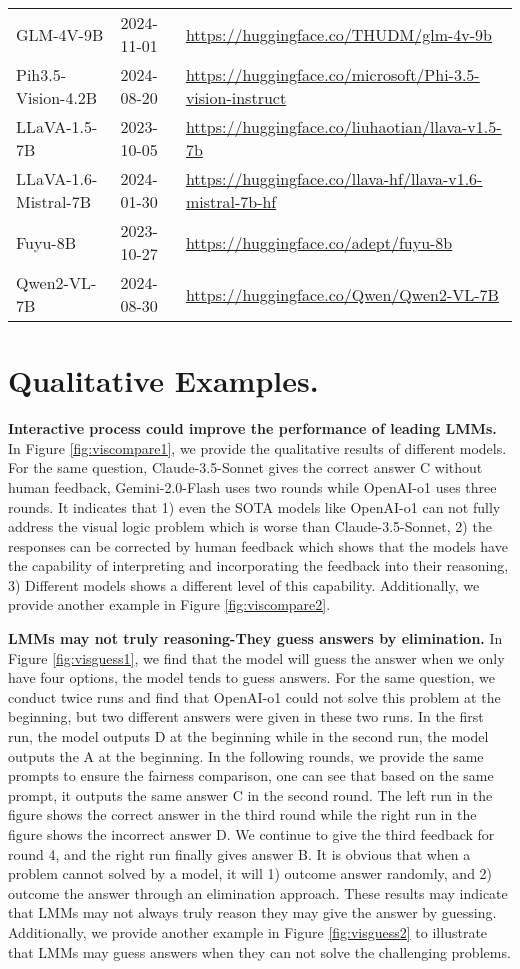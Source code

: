 \documentclass{article} %
\begin{document}
\begin{table}[ht]
{\begin{tabular}{l|l|l}
GLM-4V-9B & 2024-11-01 & \url{https://huggingface.co/THUDM/glm-4v-9b}\\
Pih3.5-Vision-4.2B & 2024-08-20 & \url{https://huggingface.co/microsoft/Phi-3.5-vision-instruct}\\
LLaVA-1.5-7B & 2023-10-05 & \url{https://huggingface.co/liuhaotian/llava-v1.5-7b}\\
LLaVA-1.6-Mistral-7B & 2024-01-30 & \url{https://huggingface.co/llava-hf/llava-v1.6-mistral-7b-hf} \\
Fuyu-8B & 2023-10-27 & \url{https://huggingface.co/adept/fuyu-8b}\\
Qwen2-VL-7B & 2024-08-30 & \url{https://huggingface.co/Qwen/Qwen2-VL-7B}\\
\bottomrule
\end{tabular}
}
\end{table}

\section{Qualitative Examples.} 
\textbf{Interactive process could improve the performance of leading LMMs.} In Figure \ref{fig:viscompare1}, we provide the qualitative results of different models. For the same question, Claude-3.5-Sonnet gives the correct answer C without human feedback, Gemini-2.0-Flash uses two rounds while OpenAI-o1 uses three rounds. It indicates that 1) even the SOTA models like OpenAI-o1 can not fully address the visual logic problem which is worse than Claude-3.5-Sonnet, 2) the responses can be corrected by human feedback which shows that the models have the capability of interpreting and incorporating the feedback into their reasoning, 3) Different models shows a different level of this capability. Additionally, we provide another example in Figure \ref{fig:viscompare2}.

\textbf{LMMs may not truly reasoning-They guess answers by elimination.} In Figure \ref{fig:visguess1}, we find that the model will guess the answer when we only have four options, the model tends to guess answers. For the same question, we conduct twice runs and find that OpenAI-o1 could not solve this problem at the beginning, but two different answers were given in these two runs. In the first run, the model outputs D at the beginning while in the second run, the model outputs the A at the beginning. In the following rounds, we provide the same prompts to ensure the fairness comparison, one can see that based on the same prompt, it outputs the same answer C in the second round. The left run in the figure shows the correct answer in the third round while the right run in the figure shows the incorrect answer D. We continue to give the third feedback for round 4, and the right run finally gives answer B. It is obvious that when a problem cannot solved by a model, it will 1) outcome answer randomly, and 2) outcome the answer through an elimination approach. These results may indicate that LMMs may not always truly reason they may give the answer by guessing. Additionally, we provide another example in Figure \ref{fig:visguess2} to illustrate that LMMs may guess answers when they can not solve the challenging problems.
\end{document}
